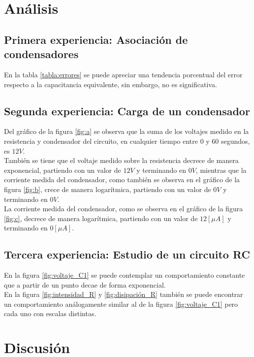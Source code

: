 \documentclass[letterpaper,11pt]{article} %
\begin{document}
\newpage
\section{Análisis}


\subsection{Primera experiencia: Asociación de condensadores}

En la tabla \ref{tabla:errores} se puede apreciar una tendencia porcentual del error respecto a la capacitancia equivalente, sin embargo, no es significativa.

\subsection{Segunda experiencia: Carga de un condensador}

Del gráfico de la figura \ref{fig:a} se observa que la suma de los voltajes medido en la resistencia y condensador del circuito, en cualquier tiempo entre 0 y 60 segundos, es $12 V$. \\

También se tiene que el voltaje medido sobre la resistencia decrece de manera exponencial, partiendo con un valor de $12 V$ y terminando en $0 V$, mientras que la corriente medida del condensador, como también se observa en el gráfico de la figura \ref{fig:b}, crece de manera logarítmica, partiendo con un valor de $0 V$ y terminando en $0 V$.\\

La corriente medida del condensador, como se observa en el gráfico de la figura \ref{fig:c}, decrece de manera logarítmica, partiendo con un valor de $12[\mu A]$ y terminando en $0[\mu A]$.

\subsection{Tercera experiencia: Estudio de un circuito RC}
En la figura \ref{fig:voltaje_C1} se puede contemplar un comportamiento constante que a partir de un punto decae de forma exponencial.\\
En la figura \ref{fig:intensidad_R} y \ref{fig:disipación_R} también se puede encontrar un comportamiento análogamente similar al de la figura \ref{fig:voltaje_C1} pero cada uno con escalas distintas.


\newpage
\section{Discusión}
\end{document}
